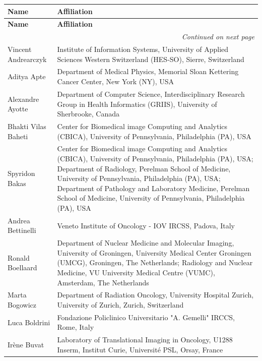 \documentclass[fleqn,a4paper,oneside,openany]{book}
\begin{document}
\begin{longtable}{p{4cm}p{10cm}}

\toprule
\textbf{Name} & \textbf{Affiliation} \\
\midrule
\endfirsthead

\toprule
\textbf{Name} & \textbf{Affiliation} \\
\midrule
\endhead

\bottomrule
\multicolumn{2}{r}{\textit{Continued on next page}}
\endfoot

\\
\endlastfoot
Vincent Andrearczyk
& Institute of Information Systems, University of Applied Sciences Western Switzerland (HES-SO), Sierre, Switzerland\\ 
Aditya Apte
& Department of Medical Physics, Memorial Sloan Kettering Cancer Center, New York (NY), USA\\ 
Alexandre Ayotte
& Department of Computer Science, Interdisciplinary Research Group in Health Informatics (GRIIS), University of Sherbrooke, Canada\\
Bhakti Vilas Baheti
& Center for Biomedical image Computing and Analytics (CBICA), University of Pennsylvania, Philadelphia (PA), USA\\ 
Spyridon Bakas
& Center for Biomedical image Computing and Analytics (CBICA), University of Pennsylvania, Philadelphia (PA), USA; Department of Radiology, Perelman School of Medicine, University of Pennsylvania, Philadelphia (PA), USA; Department of Pathology and Laboratory Medicine, Perelman School of Medicine, University of Pennsylvania, Philadelphia (PA), USA\\
Andrea Bettinelli
& Veneto Institute of Oncology - IOV IRCSS, Padova, Italy\\
Ronald Boellaard
& Department of Nuclear Medicine and Molecular Imaging, University of Groningen, University Medical Center Groningen (UMCG), Groningen, The Netherlands; Radiology and Nuclear Medicine, VU University Medical Centre (VUMC), Amsterdam, The Netherlands\\ 
Marta Bogowicz
& Department of Radiation Oncology, University Hospital Zurich, University of Zurich, Zurich, Switzerland\\ 
Luca Boldrini
& Fondazione Policlinico Universitario "A. Gemelli" IRCCS, Rome, Italy\\ 
Irène Buvat
& Laboratory of Translational Imaging in Oncology, U1288 Inserm, Institut Curie, Université PSL, Orsay, France \\ 

\end{longtable}
\end{document}
